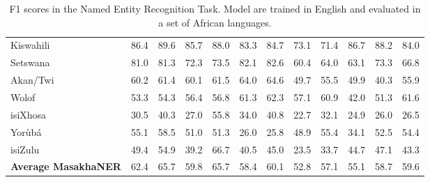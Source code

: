 \begin{table}[htb]
{\begin{tabular}{@{}lcc|cc|cc|cc|ccc@{}}
    Kiswahili & 86.4 & \cellcolor[HTML]{B7E1CD}89.6 & 85.7 & 88.0 & 83.3 & 84.7 & 73.1 & 71.4 & 86.7 & 88.2 & 84.0 \\
    Setswana & 81.0 & 81.3 & 72.3 & 73.5 & 82.1 & \cellcolor[HTML]{B7E1CD}82.6 & 60.4 & 64.0 & 63.1 & 73.3 & 66.8 \\
    Akan/Twi & 60.2 & 61.4 & 60.1 & 61.5 & 64.0 & \cellcolor[HTML]{B7E1CD}64.6 & 49.7 & 55.5 & 49.9 & 40.3 & 55.9 \\
    Wolof & 53.3 & 54.3 & 56.4 & 56.8 & 61.3 & \cellcolor[HTML]{B7E1CD}62.3 & 57.1 & 60.9 & 42.0 & 51.3 & 61.6 \\
    isiXhosa & 30.5 & 40.3 & 27.0 & \cellcolor[HTML]{B7E1CD}55.8 & 34.0 & 40.8 & 22.7 & 32.1 & 24.9 & 26.0 & 26.5 \\
    Yorùbá & 55.1 & \cellcolor[HTML]{B7E1CD}58.5 & 51.0 & 51.3 & 26.0 & 25.8 & 48.9 & 55.4 & 34.1 & 52.5 & 54.4 \\
    isiZulu & 49.4 & 54.9 & 39.2 & \cellcolor[HTML]{B7E1CD}66.7 & 40.5 & 45.0 & 23.5 & 33.7 & 44.7 & 47.1 & 43.3 \\ \midrule
    \textbf{Average MasakhaNER} & 62.4 & \cellcolor[HTML]{B7E1CD}65.7 & 59.8 & 65.7 & 58.4 & 60.1 & 52.8 & 57.1 & 55.1 & 58.7 & 59.6 \\ \bottomrule
    \end{tabular}
    }
    \caption{F1 scores in the Named Entity Recognition Task. Model are trained in English and evaluated in a set of African languages.}
    \label{tab6:NER}
    \end{table}